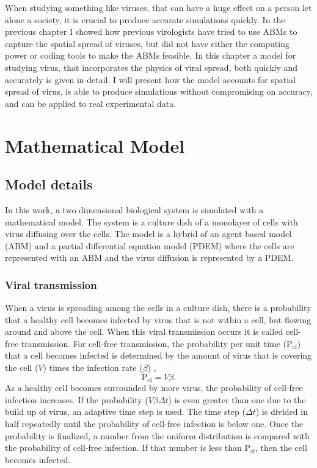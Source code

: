 When studying something like viruses, that can have a huge effect on a person let alone a society, it is crucial to produce accurate simulations quickly. In the previous chapter I showed how previous virologists have tried to use ABMs to capture the spatial spread of viruses, but did not have either the computing power or coding tools to make the ABMs feasible. In this chapter a model for studying virus, that incorporates the physics of viral spread, both quickly and accurately is given in detail. I will present how the model accounts for spatial spread of virus, is able to produce simulations without compromising on accuracy, and can be applied to real experimental data.

\section{Mathematical Model}
\subsection{Model details} 

In this work, a two dimensional biological system is simulated with a mathematical model. The system is a culture dish of a monolayer of cells with virus diffusing over the cells. The model is a hybrid of an agent based model (ABM) and a partial differential equation model (PDEM) where the cells are represented with an ABM and the virus diffusion is represented by a PDEM.

\subsubsection{Viral transmission} \label{Viral_transmission}

When a virus is spreading among the cells in a culture dish, there is a probability that a healthy cell becomes infected by virus that is not within a cell, but flowing around and above the cell. When this viral transmission occurs it is called cell-free transmission. For cell-free transmission, the probability per unit time ($\mathrm{P_{cf}}$) that a cell becomes infected is determined by the amount of virus that is covering the cell ($V$) times the infection rate ($\beta$) \cite{holder11autoimm}, 
$$\mathrm{P_{cf}} = V \beta.$$ 
As a healthy cell becomes surrounded by more virus, the probability of cell-free infection increases. If the probability ($V \beta \Delta t$) is even greater than one due to the build up of virus, an adaptive time step is used. The time step ($\Delta t$) is divided in half repeatedly until the probability of cell-free infection is below one. Once the probability is finalized, a number from the uniform distribution is compared with the probability of cell-free infection. If that number is less than $\mathrm{P_{cf}}$, then the cell becomes infected.


